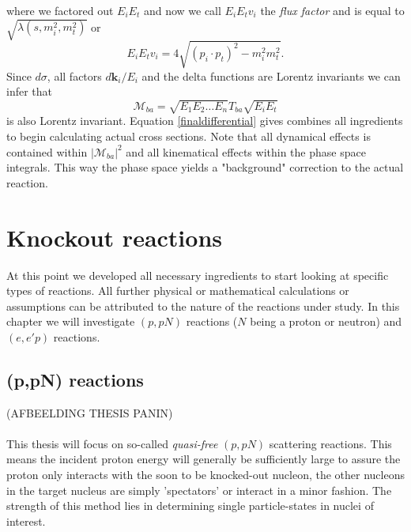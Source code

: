 \documentclass[11pt]{article}
\numberwithin{equation}{section}
\begin{document}
where we factored out $E_iE_t$ and now we call $E_iE_tv_i$ the \emph{flux factor} and is equal to $\sqrt{\lambda(s,m_i^2,m_t^2)}$ or 
\begin{equation}
E_iE_tv_i = 4\sqrt{(p_i \cdot p_t)^2 - m_i^2m_t^2}.	
\end{equation}
Since $d\sigma$, all factors $d\mathbf{k}_i/E_i$ and the delta functions are Lorentz invariants we can infer that
\begin{equation}
	\mathcal{M}_{ba} = \sqrt{E_1E_2 \ldots E_n}T_{ba}\sqrt{E_iE_t}
\end{equation}
is also Lorentz invariant. Equation \eqref{finaldifferential} gives combines all ingredients to begin calculating actual cross sections. Note that all dynamical effects is contained within $|\mathcal{M}_{ba}|^2$ and all kinematical effects within the phase space integrals. This way the phase space yields a "background" correction to the actual reaction.





\section{Knockout reactions}
At this point we developed all necessary ingredients to start looking at specific types of reactions. All further physical or mathematical calculations or assumptions can be attributed to the nature of the reactions under study. In this chapter we will investigate $(p,pN)$ reactions ($N$ being a proton or neutron) and $(e,e'p)$ reactions.

\subsection{(p,pN) reactions}
(AFBEELDING THESIS PANIN)\\
\\
This thesis will focus on so-called \emph{quasi-free} $(p,pN)$ scattering reactions. This means the incident proton energy will generally be sufficiently large to assure the proton only interacts with the soon to be knocked-out nucleon, the other nucleons in the target nucleus are simply 'spectators' or interact in a minor fashion. The strength of this method lies in determining single particle-states in nuclei of interest. 
\end{document}
